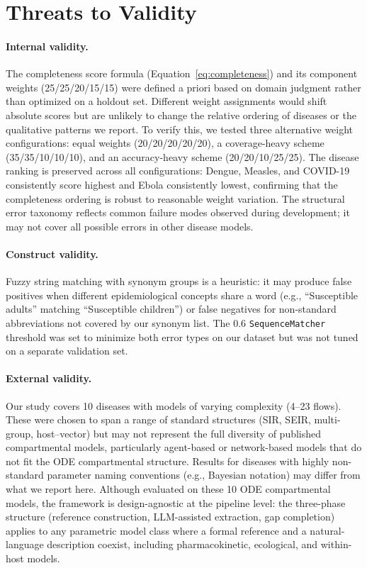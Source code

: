 \section{Threats to Validity}
\label{sec:threats}

\paragraph{Internal validity.}
The completeness score formula (Equation~\ref{eq:completeness}) and its component weights
(25/25/20/15/15) were defined a priori based on domain judgment rather than optimized on
a holdout set. Different weight assignments would shift absolute scores but are unlikely to
change the relative ordering of diseases or the qualitative patterns we report.
To verify this, we tested three alternative weight configurations: equal weights
(20/20/20/20/20), a coverage-heavy scheme (35/35/10/10/10), and an accuracy-heavy scheme
(20/20/10/25/25). The disease ranking is preserved across all configurations: Dengue,
Measles, and COVID-19 consistently score highest and Ebola consistently lowest,
confirming that the completeness ordering is robust to reasonable weight variation.
The structural error taxonomy reflects common failure modes observed during development; it may
not cover all possible errors in other disease models.

\paragraph{Construct validity.}
Fuzzy string matching with synonym groups is a heuristic: it may produce false positives
when different epidemiological concepts share a word (e.g., ``Susceptible adults'' matching
``Susceptible children'') or false negatives for non-standard abbreviations not covered by
our synonym list. The 0.6 \texttt{SequenceMatcher} threshold was set to minimize both error
types on our dataset but was not tuned on a separate validation set.

\paragraph{External validity.}
Our study covers 10 diseases with models of varying complexity (4--23 flows). These were
chosen to span a range of standard structures (SIR, SEIR, multi-group, host--vector) but
may not represent the full diversity of published compartmental models, particularly agent-based
or network-based models that do not fit the ODE compartmental structure. Results for
diseases with highly non-standard parameter naming conventions (e.g., Bayesian notation)
may differ from what we report here.
Although evaluated on these 10 ODE compartmental models, the framework is
design-agnostic at the pipeline level: the three-phase structure (reference construction,
LLM-assisted extraction, gap completion) applies to any parametric model class where a
formal reference and a natural-language description coexist, including pharmacokinetic,
ecological, and within-host models.

